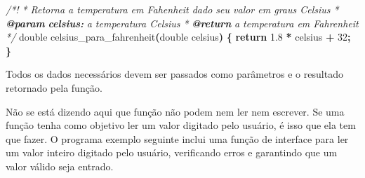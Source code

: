 \documentclass[
  11pt,
  a4paper,
]{scrbook}
\newenvironment{Shaded}{\begin{snugshade}}{\end{snugshade}}
\newcommand{\AnnotationTok}[1]{\textcolor[rgb]{0.56,0.35,0.01}{\textbf{\textit{#1}}}}
\newcommand{\CommentTok}[1]{\textcolor[rgb]{0.56,0.35,0.01}{\textit{#1}}}
\newcommand{\CommentVarTok}[1]{\textcolor[rgb]{0.56,0.35,0.01}{\textbf{\textit{#1}}}}
\newcommand{\ControlFlowTok}[1]{\textcolor[rgb]{0.13,0.29,0.53}{\textbf{#1}}}
\newcommand{\DataTypeTok}[1]{\textcolor[rgb]{0.13,0.29,0.53}{#1}}
\newcommand{\DecValTok}[1]{\textcolor[rgb]{0.00,0.00,0.81}{#1}}
\newcommand{\FloatTok}[1]{\textcolor[rgb]{0.00,0.00,0.81}{#1}}
\newcommand{\NormalTok}[1]{#1}
\newcommand{\OperatorTok}[1]{\textcolor[rgb]{0.81,0.36,0.00}{\textbf{#1}}}
\begin{document}
\begin{Shaded}
\begin{Highlighting}[]
\CommentTok{/*!}
\CommentTok{ * Retorna a temperatura em Fahenheit dado seu valor em graus Celsius}
\CommentTok{ * }\AnnotationTok{@param}\CommentTok{ }\CommentVarTok{celsius:}\CommentTok{ a temperatura Celsius}
\CommentTok{ * }\AnnotationTok{@return}\CommentTok{ a temperatura em Fahrenheit}
\CommentTok{ */}
\DataTypeTok{double}\NormalTok{ celsius\_para\_fahrenheit}\OperatorTok{(}\DataTypeTok{double}\NormalTok{ celsius}\OperatorTok{)} \OperatorTok{\{}
    \ControlFlowTok{return} \FloatTok{1.8} \OperatorTok{*}\NormalTok{ celsius }\OperatorTok{+} \DecValTok{32}\OperatorTok{;}
\OperatorTok{\}}
\end{Highlighting}
\end{Shaded}

Todos os dados necessários devem ser passados como parâmetros e o
resultado retornado pela função.

Não se está dizendo aqui que função não podem nem ler nem escrever. Se
uma função tenha como objetivo ler um valor digitado pelo usuário, é
isso que ela tem que fazer. O programa exemplo seguinte inclui uma
função de interface para ler um valor inteiro digitado pelo usuário,
verificando erros e garantindo que um valor válido seja entrado.
\end{document}
